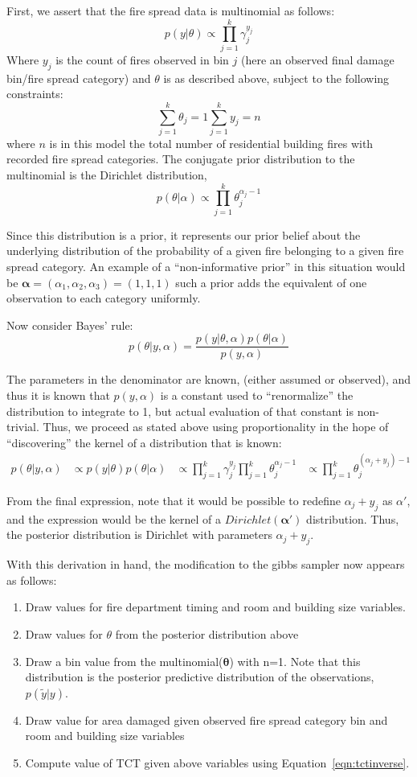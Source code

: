 \documentclass[12pt,oneside]{book}
\begin{document}
First, we assert that the fire spread data is multinomial as follows:
\[
  p(y|\theta) \propto \prod^k_{j=1} \gamma_j^{y_j}
\]
Where $y_j$ is the count of fires observed in bin $j$ (here an observed final damage bin/fire spread category) and $\theta$ is as described above, subject to the following constraints:
\[
  \sum_{j=1}^k\theta_j = 1
  \sum_{j=1}^k y_j = n
\]
where $n$ is in this model the total number of residential building fires with recorded fire spread categories. The conjugate prior distribution to the multinomial is the Dirichlet distribution,
\[
  p(\theta|\alpha) \propto \prod_{j=1}^k \theta_j^{\alpha_j-1}
\]

Since this distribution is a prior, it represents our prior belief about the underlying distribution of the probability of a given fire belonging to a given fire spread category. An example of a ``non-informative prior'' in this situation would be $\mathbf{\alpha}=(\alpha_1,\alpha_2,\alpha_3)=(1,1,1)$ such a prior adds the equivalent of one observation to each category uniformly.

Now consider Bayes' rule:
\[
  p(\theta|y,\alpha) = \frac{p(y|\theta,\alpha)p(\theta|\alpha)}{p(y,\alpha)}
\]

The parameters in the denominator are known, (either assumed or observed), and thus it is known that $p(y,\alpha)$ is a constant used to ``renormalize'' the distribution to integrate to 1, but actual evaluation of that constant is non-trivial. Thus, we proceed as stated above using proportionality in the hope of ``discovering'' the kernel of a distribution that is known:
\begin{align*}
  p(\theta|y,\alpha) &\propto p(y|\theta)p(\theta|\alpha)
  &\propto \prod^k_{j=1} \gamma_j^{y_j}\prod_{j=1}^k \theta_j^{\alpha_j-1} 
  &\propto \prod_{j=1}^k \theta_j^{(\alpha_j+y_j)-1}
\end{align*}

From the final expression, note that it would be possible to redefine $\alpha_j+y_j$ as $\alpha'$, and the expression would be the kernel of a $Dirichlet(\mathbf{\alpha}')$ distribution. Thus, the posterior distribution is Dirichlet with parameters $\alpha_j+y_j$.

With this derivation in hand, the modification to the gibbs sampler now appears as follows:
\begin{enumerate}
  \item Draw values for fire department timing and room and building size variables.
  \item Draw values for $\theta$ from the posterior distribution above
  \item Draw a bin value from the multinomial($\mathbf{\theta}$) with n=1. Note that this distribution is the posterior predictive distribution of the observations, $p(\tilde{y}|y)$.
  \item Draw value for area damaged given observed fire spread category bin and room and building size variables
  \item Compute value of TCT given above variables using Equation~\ref{eqn:tctinverse}.
\end{enumerate}
\end{document}
